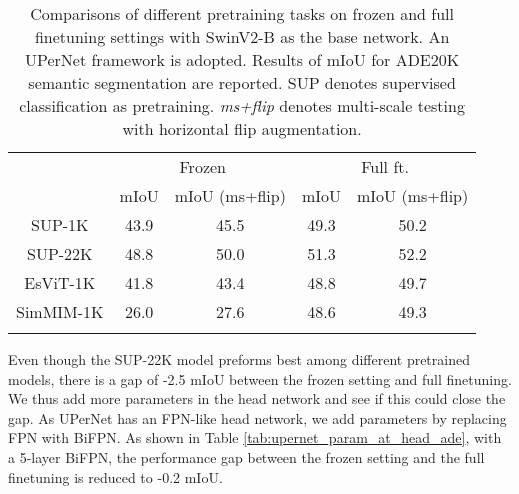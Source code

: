 \documentclass{article}
\begin{document}
\begin{table}[htb]
        \centering
        \addtolength{\tabcolsep}{-1.0pt}
        \begin{tabular}{c|cc|cc}
            \Xhline{1.0pt}
            \multirow{2}{*}{Approach} & \multicolumn{2}{c|}{Frozen} & \multicolumn{2}{c}{Full ft.} \\
            & mIoU & mIoU (ms+flip) & mIoU & mIoU (ms+flip) \\
            \hline
            SUP-1K & 43.9 & 45.5 & 49.3 & 50.2 \\
            SUP-22K & 48.8 & 50.0 & 51.3 & 52.2 \\
            EsViT-1K & 41.8 & 43.4 & 48.8 & 49.7 \\
            SimMIM-1K & 26.0 & 27.6 & 48.6 & 49.3 \\
          \Xhline{1.0pt}  
       \end{tabular}
     \caption{Comparisons of different pretraining tasks on frozen and full finetuning settings with SwinV2-B as the base network. An UPerNet framework is adopted. Results of mIoU for ADE20K semantic segmentation are reported. SUP denotes supervised classification as pretraining. \emph{ms+flip} denotes multi-scale testing with horizontal flip augmentation.}
     \label{tab:upernet_pretrain_task}
\end{table}

Even though the SUP-22K model preforms best among different pretrained models, there is a gap of -2.5 mIoU between the frozen setting and full finetuning. We thus add more parameters in the head network and see if this could close the gap. As UPerNet has an FPN-like head network, we add parameters by replacing FPN with BiFPN. As shown in Table \ref{tab:upernet_param_at_head_ade}, with a 5-layer BiFPN, the performance gap between the frozen setting and the full finetuning is reduced to -0.2 mIoU.
\end{document}
